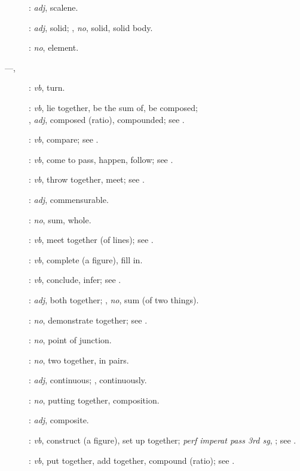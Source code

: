 {\begin{description}
\item[]: {\em adj}, scalene.
\item[]: {\em adj}, solid; , {\em no}, solid, solid body.
\item[]: {\em no}, element.
\item[ ---, ]:
{\em vb}, turn.
\item[]: {\em vb}, lie together, be the sum of, be composed;\\ , {\em adj}, composed (ratio), compounded; see .
\item[]: {\em vb}, compare; see .
\item[]: {\em vb}, come to pass, happen, follow; see
.
\item[]: {\em vb}, throw together, meet; see .
\item[]: {\em adj}, commensurable.
\item[]: {\em no}, sum, whole.
\item[]: {\em vb}, meet together (of lines); see .
\item[]: {\em vb}, complete (a figure), fill in.
\item[]: {\em vb}, conclude, infer; see .
\item[]: {\em adj}, both together;
, {\em no}, sum (of two things).
\item[]: {\em no}, demonstrate together; see .
\item[]: {\em no}, point of junction.
\item[]: {\em no}, two together, in pairs.
\item[]: {\em adj}, continuous; , 
continuously.
\item[]: {\em no}, putting together, composition.
\item[]: {\em adj}, composite.
\item[]: {\em vb}, construct (a figure), set up together;  {\em perf imperat pass 3rd sg}, ; see .
\item[]: {\em vb}, put together, add together, compound (ratio); see .

\end{description}}
